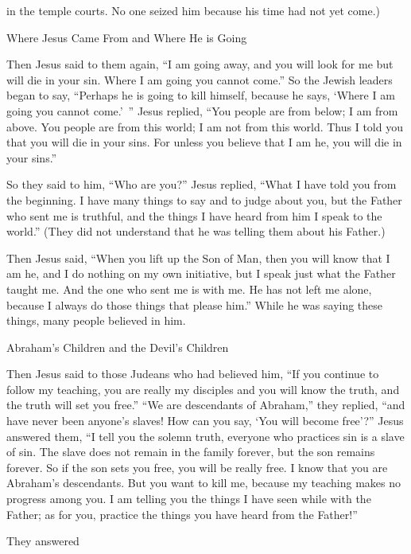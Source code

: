 {in
the temple courts.
No one
seized
him
because
his
time
had
not yet
come.)
\par }{\SH Where Jesus Came From and Where He is Going
\par }{\PP {}Then
Jesus said
to them
again, “I
am going away,
and
you will look for
me
but
will die
in
your
sin.
Where
I
am going
you
cannot
come.”
So
the Jewish leaders
began to say, “Perhaps
he is going to kill
himself,
because
he says,
‘Where
I
am going
you
cannot
come.’ ”
Jesus replied, “You
people are
from
below;
I
am
from
above.
You
people are
from
this
world;
I
am
not
from
this
world.
Thus
I told
you
that
you will die
in
your
sins.
For
unless
you believe
that
I am he,
you will die
in
your
sins.”
\par }{\PP {}So
they said
to him,
“Who
are
you?” Jesus
replied, “What
I have told
you
from the beginning.
I have
many things
to say
and
to judge
about
you,
but
the Father who sent
me
is
truthful,
and the things
I have heard
from
him
I speak
to
the world.”
(They did
not
understand
that
he was telling
them
about his Father.)
\par }{\PP {}Then
Jesus
said, “When
you lift up
the Son
of Man,
then
you will know
that
I am he,
and
I do
nothing
on
my own initiative,
but
I speak
just
what the Father
taught
me.
And
the one who sent
me
is
with
me.
He has
not
left
me
alone,
because
I
always
do
those things that please
him.”
While
he
was saying
these things,
many people
believed
in
him.
\par }{\SH Abraham’s Children and the Devil’s Children
\par }{\PP {}Then
Jesus
said
to
those Judeans
who had believed
him,
“If
you
continue
to follow
my
teaching,
you are
really
my
disciples
and
you will know
the truth,
and
the truth
will set
you
free.”
“We are
descendants
of Abraham,”
they replied, “and
have
never
been
anyone’s
slaves! How
can
you
say, ‘You
will become
free’?”
Jesus
answered
them,
“I tell
you
the solemn truth,
everyone
who practices
sin
is
a slave
of sin.
The slave
does
not
remain
in
the family
forever,
but the son
remains
forever.
So
if
the son
sets
you
free,
you will be
really
free.
I know
that
you are
Abraham’s
descendants.
But
you want
to kill
me,
because
my
teaching
makes
no
progress
among
you.
I
am telling
you the things I have seen
while with
the Father;
as for you, practice
the things you
have heard
from
the Father!”
\par }{\PP {}They answered
}
